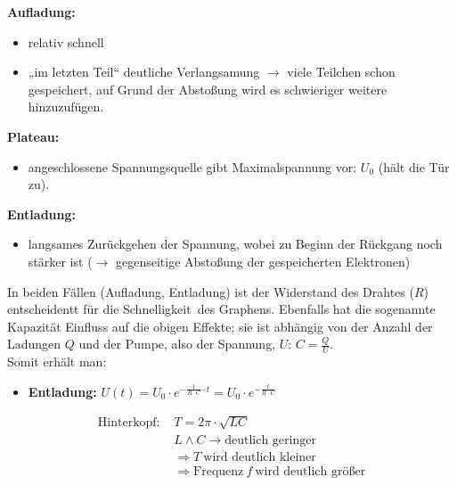 \documentclass{report}
\begin{document}
	\newpage
	\noindent
	\textbf{Aufladung:}
	\begin{itemize}
		\item relativ schnell
		\item „im letzten Teil“ deutliche Verlangsamung
$\to$ viele Teilchen schon gespeichert, auf Grund der Abstoßung wird es schwieriger weitere hinzuzufügen.
	\end{itemize}
	\textbf{Plateau:}
	\begin{itemize}
		\item angeschlossene Spannungsquelle gibt Maximalspannung vor: $U_0$ (\dq hält die Tür zu\dq ).
	\end{itemize}
	\textbf{Entladung:}
	\begin{itemize}
		\item langsames Zurückgehen der Spannung, wobei zu Beginn der Rückgang noch stärker ist ($\to$ gegenseitige Abstoßung der gespeicherten Elektronen)
	\end{itemize}
	\vspace{1cm}
	In beiden Fällen (Aufladung, Entladung) ist der Widerstand des Drahtes ($R$) entscheidentt für die \dq Schnelligkeit\dq\ des Graphens.
	Ebenfalls hat die sogenannte Kapazität Einfluss auf die obigen Effekte; sie ist abhängig von der Anzahl der Ladungen $Q$ und der \dq Pumpe\dq, also der Spannung, $U$: $C = \frac{Q}{U}$.
	\\
	Somit erhält man:
	\begin{itemize}
		\item \textbf{Entladung:} $U(t) = U_0 \cdot e^{-\frac{1}{R\cdot C} \cdot t} = U_0 \cdot e^{-\frac{t}{R\cdot C}}$
	\end{itemize}
	
	\begin{align*}
		\text{Hinterkopf: }& T = 2\pi \cdot \sqrt{LC} \\
	&L \land C \to \text{deutlich geringer} \\
	&\Rightarrow T\ \text{wird deutlich kleiner} \\
&\Rightarrow \text{Frequenz}\ f\ \text{wird deutlich größer}
	\end{align*}
	
\end{document}

